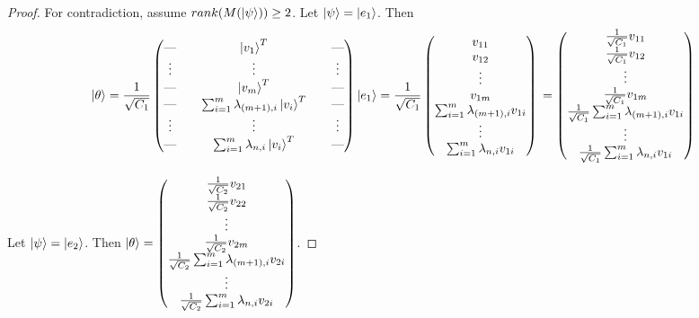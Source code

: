 \begin{proof}
For contradiction, assume $rank(M(\ket{\psi})) \ge 2$. Let $\ket{\psi}=\ket{e_1}$. Then
\begin{equation}
\ket{\theta} = \frac{1}{\sqrt{C_1}}
\begin{pmatrix}
\text{---} && \ket{v_1}^T &&\text{---} \\
\vdots && \vdots && \vdots\\
\text{---} && \ket{v_m}^T && \text{---} \\
\text{---} && \sum_{i=1}^m \lambda_{(m+1), i}\ket{v_i}^T  &&\text{---} \\
\vdots && \vdots && \vdots \\
\text{---} && \sum_{i=1}^m \lambda_{n, i}\ket{v_i}^T &&\text{---} \\
\end{pmatrix}\ket{e_1}
=\frac{1}{\sqrt{C_1}}
\begin{pmatrix}
v_{11}\\
v_{12}\\
\vdots\\
v_{1m}\\
\sum_{i=1}^m \lambda_{(m+1), i} v_{1i}\\
\vdots\\
\sum_{i=1}^m \lambda_{n, i} v_{1i}
\end{pmatrix}\\
=\begin{pmatrix}
\frac{1}{\sqrt{C_1}}v_{11}\\
\frac{1}{\sqrt{C_1}}v_{12}\\
\vdots\\
\frac{1}{\sqrt{C_1}}v_{1m}\\
\frac{1}{\sqrt{C_1}}\sum_{i=1}^m \lambda_{(m+1), i} v_{1i}\\
\vdots\\
\frac{1}{\sqrt{C_1}}\sum_{i=1}^m \lambda_{n, i} v_{1i}
\end{pmatrix}    
\end{equation}

Let $\ket{\psi}=\ket{e_2}$. Then
$\ket{\theta}=
\begin{pmatrix}
\frac{1}{\sqrt{C_2}}v_{21}\\
\frac{1}{\sqrt{C_2}}v_{22}\\
\vdots\\
\frac{1}{\sqrt{C_2}}v_{2m}\\
\frac{1}{\sqrt{C_2}}\sum_{i=1}^m \lambda_{(m+1), i} v_{2i}\\
\vdots\\
\frac{1}{\sqrt{C_2}}\sum_{i=1}^m \lambda_{n, i} v_{2i}
\end{pmatrix}$.


\end{proof}
